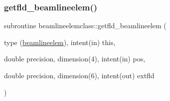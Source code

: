 \mbox{\label{namespacebeamlineelemclass_a21fd373bab34a4c18c8bcf5b00816c0c}} 
\subsubsection{\texorpdfstring{getfld\_beamlineelem()}{getfld\_beamlineelem()}}
{\footnotesize\ttfamily subroutine beamlineelemclass\+::getfld\+\_\+beamlineelem (\begin{DoxyParamCaption}\item[{type (\mbox{\hyperlink{namespacebeamlineelemclass_structbeamlineelemclass_1_1beamlineelem}{beamlineelem}}), intent(in)}]{this,  }\item[{double precision, dimension(4), intent(in)}]{pos,  }\item[{double precision, dimension(6), intent(out)}]{extfld }\end{DoxyParamCaption})}

